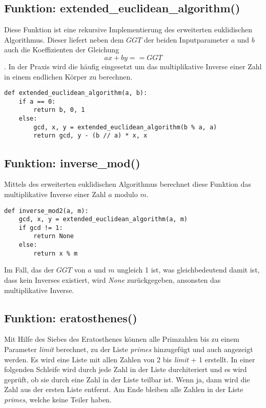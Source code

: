 \subsection{Funktion: extended\_euclidean\_algorithm()}
Diese Funktion ist eine rekursive Implementierung des erweiterten euklidischen Algorithmus. Dieser liefert neben dem $GGT$ der beiden Inputparameter $a$ und $b$ auch die Koeffizienten der Gleichung $$ax + by == GGT$$. In der Praxis wird die häufig eingesetzt um das multiplikative Inverse einer Zahl in einem endlichen Körper zu berechnen.
\vspace{\baselineskip}
\begin{lstlisting}[caption={Funktion: extended\_euclidean\_algorithm()}, captionpos=b]
def extended_euclidean_algorithm(a, b):
    if a == 0:
        return b, 0, 1
    else:
        gcd, x, y = extended_euclidean_algorithm(b % a, a)
        return gcd, y - (b // a) * x, x
\end{lstlisting}
\vspace{\baselineskip}

\subsection{Funktion: inverse\_mod()}
Mittels des erweiterten euklidischen Algorithmus berechnet diese Funktion das multiplikative Inverse einer Zahl $a$ modulo $m$.

\vspace{\baselineskip}
\begin{lstlisting}[caption={Funktion: inverse\_mod()}, captionpos=b]
def inverse_mod2(a, m):
    gcd, x, y = extended_euclidean_algorithm(a, m)
    if gcd != 1:
        return None
    else:
        return x % m
\end{lstlisting}
\vspace{\baselineskip}

Im Fall, das der $GGT$ von $a$ und $m$ ungleich 1 ist, was gleichbedeutend damit ist, dass kein Inverses existiert, wird \textit{None} zurückgegeben, ansonsten das  multiplikative Inverse.


\subsection{Funktion: eratosthenes()}
Mit Hilfe des Siebes des Eratosthenes können alle Primzahlen bis zu einem Parameter \textit{limit} berechnet, zu der Liste \textit{primes} hinzugefügt und auch angezeigt werden. Es wird eine Liste mit allen Zahlen von 2 bis \textit{limit} + 1 erstellt. In einer folgenden Schleife wird durch jede Zahl in der Liste durchiteriert und es wird geprüft, ob sie durch eine Zahl in der Liste teilbar ist. Wenn ja, dann wird die Zahl aus der ersten Liste entfernt. Am Ende bleiben alle Zahlen in der Liste \textit{primes}, welche keine Teiler haben. 

